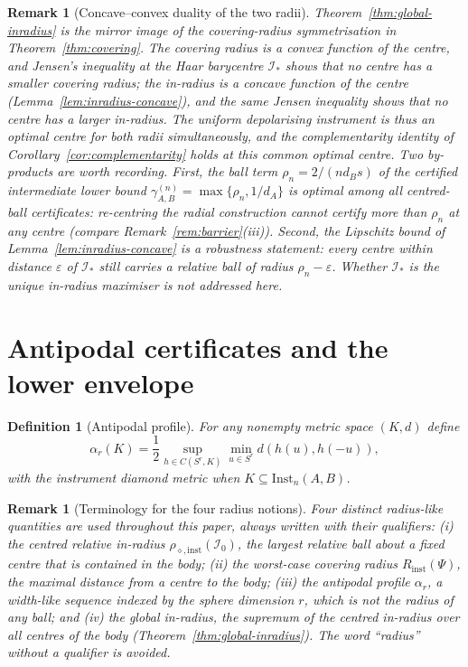 \documentclass[11pt,a4paper]{article}
\newtheorem{definition}[theorem]{Definition}
\newtheorem{remark}[theorem]{Remark}
\newcommand{\Inst}{\mathrm{Inst}}
\begin{document}
\begin{remark}[Concave--convex duality of the two radii]
\label{rem:duality}
Theorem~\ref{thm:global-inradius} is the mirror image of the covering-radius symmetrisation in Theorem~\ref{thm:covering}. The covering radius is a convex function of the centre, and Jensen's inequality at the Haar barycentre $\mathcal I_*$ shows that no centre has a smaller covering radius; the in-radius is a concave function of the centre (Lemma~\ref{lem:inradius-concave}), and the same Jensen inequality shows that no centre has a larger in-radius. The uniform depolarising instrument is thus an optimal centre for both radii simultaneously, and the complementarity identity of Corollary~\ref{cor:complementarity} holds at this common optimal centre. Two by-products are worth recording. First, the ball term $\rho_n=2/(nd_Bs)$ of the certified intermediate lower bound $\gamma_{A,B}^{(n)}=\max\{\rho_n,1/d_A\}$ is optimal among all centred-ball certificates: re-centring the radial construction cannot certify more than $\rho_n$ at any centre (compare Remark~\ref{rem:barrier}(iii)). Second, the Lipschitz bound of Lemma~\ref{lem:inradius-concave} is a robustness statement: every centre within distance $\varepsilon$ of $\mathcal I_*$ still carries a relative ball of radius $\rho_n-\varepsilon$. Whether $\mathcal I_*$ is the unique in-radius maximiser is not addressed here.
\end{remark}

\section{Antipodal certificates and the lower envelope}
\label{sec:lower}

\begin{definition}[Antipodal profile]
\label{def:alpha}
For any nonempty metric space $(K,d)$ define
\[
\alpha_r(K)=\frac12\sup_{h\in C(S^r,K)}\min_{u\in S^r}d(h(u),h(-u)),
\]
with the instrument diamond metric when $K\subseteq\Inst_n(A,B)$.
\end{definition}

\begin{remark}[Terminology for the four radius notions]
\label{rem:radius-terminology}
Four distinct radius-like quantities are used throughout this paper, always written with their qualifiers: (i) the \emph{centred relative in-radius} $\rho_{\diamond,\mathrm{inst}}(\mathcal I_0)$, the largest relative ball about a fixed centre that is contained in the body; (ii) the \emph{worst-case covering radius} $R_{\mathrm{inst}}(\Psi)$, the maximal distance from a centre to the body; (iii) the \emph{antipodal profile} $\alpha_r$, a width-like sequence indexed by the sphere dimension $r$, which is not the radius of any ball; and (iv) the \emph{global in-radius}, the supremum of the centred in-radius over all centres of the body (Theorem~\ref{thm:global-inradius}). The word ``radius'' without a qualifier is avoided.
\end{remark}
\end{document}
